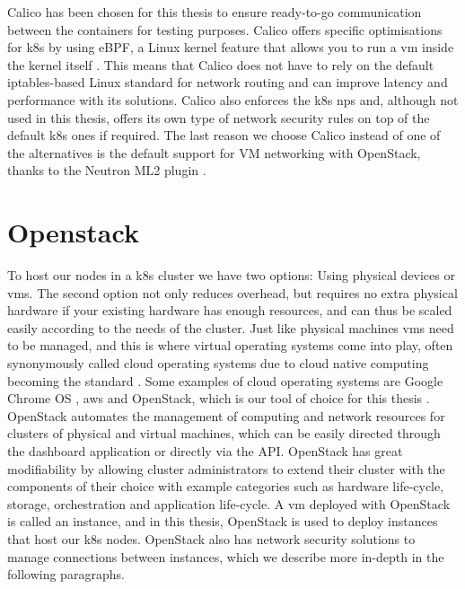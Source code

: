 Calico has been chosen for this thesis to ensure ready-to-go communication between the containers for testing purposes. Calico offers specific optimisations for \acrshort{k8s} by using eBPF, a Linux kernel feature that allows you to run a \acrshort{vm} inside the kernel itself \cite{ebpf}. This means that Calico does not have to rely on the default iptables-based Linux standard for network routing and can improve latency and performance with its solutions. Calico also enforces the \acrshort{k8s} \acrshort{np}s and, although not used in this thesis, offers its own type of network security rules on top of the default \acrshort{k8s} ones if required. The last reason we choose Calico instead of one of the alternatives is the default support for VM networking with OpenStack, thanks to the Neutron ML2 plugin \cite{neutron}. 


\section{Openstack}\label{sec:openstack} To host our nodes in a \acrshort{k8s} cluster we have two options: Using physical devices or \acrlong{vm}s. The second option not only reduces overhead, but requires no extra physical hardware if your existing hardware has enough resources, and can thus be scaled easily according to the needs of the cluster. Just like physical machines \acrshort{vm}s need to be managed, and this is where virtual operating systems come into play, often synonymously called cloud operating systems due to cloud native computing becoming the standard \cite{CNCFSurvey}. Some examples of cloud operating systems are Google Chrome OS \cite{chromeos}, \acrshort{aws} \cite{aws} and OpenStack, which is our tool of choice for this thesis \cite{Openstack}.
\\[10pt]

OpenStack automates the management of computing and network resources for clusters of physical and virtual machines, which can be easily directed through the dashboard application or directly via the API. OpenStack has great modifiability by allowing cluster administrators to extend their cluster with the components of their choice with example categories such as hardware life-cycle, storage, orchestration and application life-cycle. A \acrshort{vm} deployed with OpenStack is called an instance, and in this thesis, OpenStack is used to deploy instances that host our \acrshort{k8s} nodes. OpenStack also has network security solutions to manage connections between instances, which we describe more in-depth in the following paragraphs.
\\[10pt]

